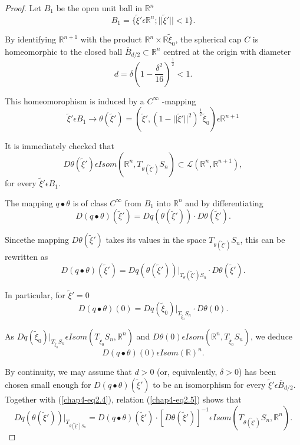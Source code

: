 \begin{proof}
Let $B_{1}$ be the open unit ball in $\mathbb{R}^{n}$
$$
B_{1} = \{\widetilde{\xi}' \epsilon \mathbb{R}^{n} ;
||\widetilde{\xi}'|| < 1\}.
$$

By identifying $\mathbb{R}^{n+1}$ with the product $\mathbb{R}^{n}
\times \mathbb{R}\widetilde{\xi}_{0}$, the spherical cap $C$ is
homeomorphic to the closed ball $\overline{B}_{d/2} \subset
\mathbb{R}^{n}$ centred at the origin with diameter
$$
d = \delta \left(1 - \frac{\delta^{2}}{16}\right)^{\frac{1}{2}} < 1.
$$ 

This homeomorophism is induced by a $C^{\infty}$ -mapping
$$
\widetilde{\xi}' \epsilon B_{1} \to \theta(\widetilde{\xi}') =
(\widetilde{\xi}', (1 -
||\widetilde{\xi}'||^{2})^{\frac{1}{2}}\widetilde{\xi}_{0}) \epsilon
\mathbb{R}^{n+1} 
$$

It is immediately checked that
\begin{equation*}
D\theta(\widetilde{\xi}') \epsilon Isom (\mathbb{R}^{n},
T_{\theta(\widetilde{\xi}')}S_{n}) \subset \mathscr{L}
(\mathbb{R}^{n}, \mathbb{R}^{n+1}),\tag{2.4}\label{chap4-eq2.4}
\end{equation*}
for every $\widetilde{\xi}' \epsilon B_{1}$.

The mapping $q \bullet \theta$ is of class $C^{\infty}$ from $B_{1}$
into $\mathbb{R}^{n}$ and by differentiating
$$
D(q \bullet \theta) (\widetilde{\xi}') = Dq(\theta(\widetilde{\xi}'))
\cdot D\theta(\widetilde{\xi}').
$$

Since\pageoriginale the mapping $D\theta(\widetilde{\xi}')$ takes its
values in the space $T_{\theta(\widetilde{\xi}')} S_{n}$, this can be
rewritten as
\begin{equation*}
D(q \bullet \theta)(\widetilde{\xi}') = Dq(\theta(\widetilde{\xi}'))
|_{T_{\theta}(\widetilde{\xi}') S_{n}} \cdot
D\theta(\widetilde{\xi}').\tag{2.5}\label{chap4-eq2.5} 
\end{equation*}

In particular, for $\widetilde{\xi}' = 0$
$$
D(q \bullet \theta)(0) = Dq(\widetilde{\xi}_{0})
|_{T_{\widetilde{\xi}_{0}} S_{n}} \cdot D\theta(0).
$$

As $Dq(\widetilde{\xi}_0) |_{T_{\widetilde{\xi}_{0}} S_{n}} \epsilon
Isom (T_{\widetilde{\xi}_{0}} S_{n}, \mathbb{R}^{n})$ and $D\theta(0)
\epsilon Isom (\mathbb{R}^{n}, T_{\widetilde{\xi}_{0}} S_{n})$, we
deduce
$$
D(q \bullet \theta)(0) \epsilon Isom (\mathbb{R})^{n}.
$$

By continuity, we may assume that $d > 0$ (or, equivalently, $\delta >
0$) has been chosen small enough for $D(q \bullet \theta)
(\widetilde{\xi}')$ to be an isomorphism for every $\widetilde{\xi}'
\epsilon \overline{B}_{d/2}$. Together with (\ref{chap4-eq2.4}),
relation (\ref{chap4-eq2.5}) shows that
\begin{equation*}
Dq(\theta(\widetilde{\xi}')) |_{T_{\theta(\widetilde{\xi}')S_{n}}} =
D(q \bullet \theta) (\widetilde{\xi}') \cdot
[D\theta(\widetilde{\xi}')]^{-1} \epsilon Isom
(T_{\theta(\widetilde{\xi}')}S_{n}, \mathbb{R}^{n}).\tag{2.6}\label{chap4-eq2.6}
\end{equation*}


\end{proof}
